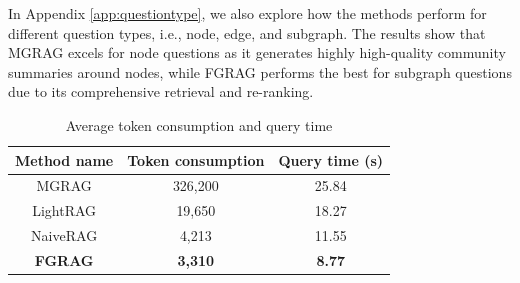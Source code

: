 
In Appendix \ref{app:questiontype}, we also explore how the methods perform for different question types, i.e., node, edge, and subgraph. The results show that MGRAG excels for node questions as it generates highly high-quality community summaries around nodes, while FGRAG performs the best for subgraph questions due to its comprehensive retrieval and re-ranking. 







\renewcommand{\arraystretch}{1}
\begin{table}
  \caption{Average token consumption and query time }
  \vspace{-0.5em}
  \label{tab: tokentime}
  \begin{tabular}{ccc}
    \toprule
      Method name & Token consumption & Query time (s)\\
    \midrule
    MGRAG & 326,200 & 25.84\\
    LightRAG & 19,650 & 18.27 \\
    NaiveRAG & 4,213 & 11.55 \\
    \textbf{FGRAG} & \textbf{3,310} & \textbf{8.77}\\
    \bottomrule
  \end{tabular}
\end{table}

